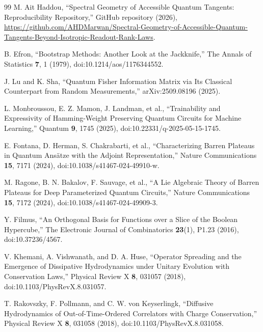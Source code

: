 \begin{thebibliography}{99}
M. Ait Haddou,
``Spectral Geometry of Accessible Quantum Tangents: Reproducibility Repository,''
GitHub repository (2026),
\url{https://github.com/AHDMarwan/Spectral-Geometry-of-Accessible-Quantum-Tangents-Beyond-Isotropic-Readout-Rank-Laws}.

B. Efron,
``Bootstrap Methods: Another Look at the Jackknife,''
The Annals of Statistics \textbf{7}, 1 (1979), doi:10.1214/aos/1176344552.

J. Lu and K. Sha,
``Quantum Fisher Information Matrix via Its Classical Counterpart from Random Measurements,''
arXiv:2509.08196 (2025).

L. Monbroussou, E. Z. Mamon, J. Landman, et al.,
``Trainability and Expressivity of Hamming-Weight Preserving Quantum Circuits for Machine Learning,''
Quantum \textbf{9}, 1745 (2025), doi:10.22331/q-2025-05-15-1745.

E. Fontana, D. Herman, S. Chakrabarti, et al.,
``Characterizing Barren Plateaus in Quantum Ans\"atze with the Adjoint Representation,''
Nature Communications \textbf{15}, 7171 (2024), doi:10.1038/s41467-024-49910-w.

M. Ragone, B. N. Bakalov, F. Sauvage, et al.,
``A Lie Algebraic Theory of Barren Plateaus for Deep Parameterized Quantum Circuits,''
Nature Communications \textbf{15}, 7172 (2024), doi:10.1038/s41467-024-49909-3.

Y. Filmus,
``An Orthogonal Basis for Functions over a Slice of the Boolean Hypercube,''
The Electronic Journal of Combinatorics \textbf{23}(1), P1.23 (2016), doi:10.37236/4567.

V. Khemani, A. Vishwanath, and D. A. Huse,
``Operator Spreading and the Emergence of Dissipative Hydrodynamics under Unitary Evolution with Conservation Laws,''
Physical Review X \textbf{8}, 031057 (2018), doi:10.1103/PhysRevX.8.031057.

T. Rakovszky, F. Pollmann, and C. W. von Keyserlingk,
``Diffusive Hydrodynamics of Out-of-Time-Ordered Correlators with Charge Conservation,''
Physical Review X \textbf{8}, 031058 (2018), doi:10.1103/PhysRevX.8.031058.

\end{thebibliography}
